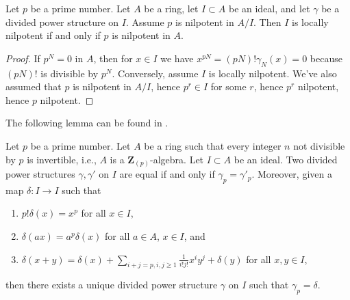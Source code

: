\begin{lemma}
\label{lemma-nil}
Let $p$ be a prime number. Let $A$ be a ring, let $I \subset A$ be an ideal,
and let $\gamma$ be a divided power structure on $I$. Assume $p$ is nilpotent
in $A/I$. Then $I$ is locally nilpotent if and only if $p$ is nilpotent in $A$.
\end{lemma}

\begin{proof}
If $p^N = 0$ in $A$, then for $x \in I$ we have
$x^{pN} = (pN)!\gamma_N(x) = 0$ because $(pN)!$ is
divisible by $p^N$. Conversely, assume $I$ is locally nilpotent.
We've also assumed that $p$ is nilpotent in $A/I$, hence
$p^r \in I$ for some $r$, hence $p^r$ nilpotent, hence $p$ nilpotent.
\end{proof}

\noindent
The following lemma can be found in \cite{BO}.

\begin{lemma}
\label{lemma-need-only-gamma-p}
Let $p$ be a prime number. Let $A$ be a ring such that every integer $n$
not divisible by $p$ is invertible, i.e., $A$ is a $\mathbf{Z}_{(p)}$-algebra.
Let $I \subset A$ be an ideal. Two divided power structures
$\gamma, \gamma'$ on $I$ are equal if and only if $\gamma_p = \gamma'_p$.
Moreover, given a map $\delta : I \to I$ such that
\begin{enumerate}
\item $p!\delta(x) = x^p$ for all $x \in I$,
\item $\delta(ax) = a^p\delta(x)$ for all $a \in A$, $x \in I$, and
\item
$\delta(x + y) =
\delta(x) +
\sum\nolimits_{i + j = p, i,j \geq 1} \frac{1}{i!j!} x^i y^j +
\delta(y)$ for all $x, y \in I$,
\end{enumerate}
then there exists a unique divided power structure $\gamma$ on $I$ such
that $\gamma_p = \delta$.
\end{lemma}

